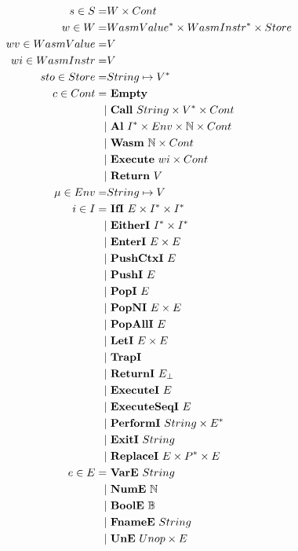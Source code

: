 \begin{align*}
%
  s \in S =& W \times Cont \\
%
  w \in W =& \seq{WasmValue} \times \seq{WasmInstr} \times Store \\
  wv \in WasmValue =& V \\
  wi \in WasmInstr =& V \\
%
  sto \in Store =& String \mapsto \seq V \\
%
  c \in Cont =& ~ \mt \\
    | & ~ \call ~ String \times \seq V \times Cont \\
    | & ~ \al ~ \seq I \times Env \times \mathbb N \times Cont \\
    | & ~ \wasm ~ \mathbb N \times Cont \\
    | & ~ \exe ~ wi \times Cont \\
    | & ~ \ret ~ V \\
%
  \mu \in Env =& String \mapsto V \\
%
  i \in I =& ~ \ifi ~ E \times \seq I \times \seq I \\
    | & ~ \eitheri ~ \seq I \times \seq I \\
    | & ~ \enteri ~ E \times E \\
    | & ~ \pushctxi ~ E \\
    | & ~ \pushi ~ E \\
    | & ~ \popi ~ E \\
    | & ~ \popni ~ E \times E \\
    | & ~ \popalli ~ E \\
    | & ~ \leti ~ E \times E \\
    | & ~ \trapi \\
    | & ~ \returni ~ E_{\bot} \\
    | & ~ \executei ~ E \\
    | & ~ \executeseqi ~ E \\
    | & ~ \performi ~ String \times \seq{E} \\
    | & ~ \exiti ~ String \\
    | & ~ \replacei ~ E \times \seq P \times E \\
%
  e \in E =& ~ \vare ~ String \\
    | & ~ \nume ~ \mathbb N \\
    | & ~ \boole ~ \mathbb B \\
    | & ~ \fnamee ~ String \\
    | & ~ \une ~ Unop \times E \\

\end{align*}
